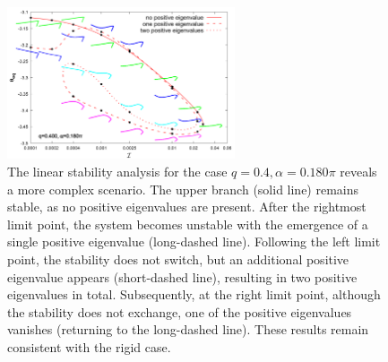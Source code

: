\documentclass[a4paper,12pt]{report}
\begin{document}
\begin{figure}[!h]
	\begin{center}
		\includegraphics[width=0.6\textwidth]{plot/solid_dash_initial_combine_elastic_beam_I_theta_q_0.400_alpha_0.180pi_initial_-4.80_0.png}
		\caption{The linear stability analysis for the case $q=0.4,\alpha=0.180\pi$ reveals a more complex scenario. The upper branch (solid line) remains stable, as no positive eigenvalues are present. After the rightmost limit point, the system becomes unstable with the emergence of a single positive eigenvalue (long-dashed line). Following the left limit point, the stability does not switch, but an additional positive eigenvalue appears (short-dashed line), resulting in two positive eigenvalues in total. Subsequently, at the right limit point, although the stability does not exchange, one of the positive eigenvalues vanishes (returning to the long-dashed line). These results remain consistent with the rigid case.}
		\label{fig:11}
	\end{center}
\end{figure}
\end{document}
